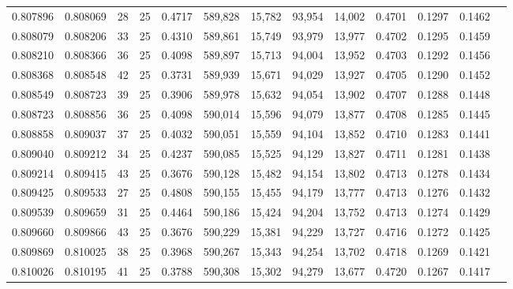 \begin{tabular}{rrrrrrrrrrrrr}
0.807896 & 0.808069 &    28 &  25 &                                     0.4717 & 589,828 &  15,782 &  93,954 &  14,002 & 0.4701 & 0.1297 & 0.1462 \\
0.808079 & 0.808206 &    33 &  25 &                                     0.4310 & 589,861 &  15,749 &  93,979 &  13,977 & 0.4702 & 0.1295 & 0.1459 \\
0.808210 & 0.808366 &    36 &  25 &                                     0.4098 & 589,897 &  15,713 &  94,004 &  13,952 & 0.4703 & 0.1292 & 0.1456 \\
0.808368 & 0.808548 &    42 &  25 &                                     0.3731 & 589,939 &  15,671 &  94,029 &  13,927 & 0.4705 & 0.1290 & 0.1452 \\
0.808549 & 0.808723 &    39 &  25 &                                     0.3906 & 589,978 &  15,632 &  94,054 &  13,902 & 0.4707 & 0.1288 & 0.1448 \\
0.808723 & 0.808856 &    36 &  25 &                                     0.4098 & 590,014 &  15,596 &  94,079 &  13,877 & 0.4708 & 0.1285 & 0.1445 \\
0.808858 & 0.809037 &    37 &  25 &                                     0.4032 & 590,051 &  15,559 &  94,104 &  13,852 & 0.4710 & 0.1283 & 0.1441 \\
0.809040 & 0.809212 &    34 &  25 &                                     0.4237 & 590,085 &  15,525 &  94,129 &  13,827 & 0.4711 & 0.1281 & 0.1438 \\
0.809214 & 0.809415 &    43 &  25 &                                     0.3676 & 590,128 &  15,482 &  94,154 &  13,802 & 0.4713 & 0.1278 & 0.1434 \\
0.809425 & 0.809533 &    27 &  25 &                                     0.4808 & 590,155 &  15,455 &  94,179 &  13,777 & 0.4713 & 0.1276 & 0.1432 \\
0.809539 & 0.809659 &    31 &  25 &                                     0.4464 & 590,186 &  15,424 &  94,204 &  13,752 & 0.4713 & 0.1274 & 0.1429 \\
0.809660 & 0.809866 &    43 &  25 &                                     0.3676 & 590,229 &  15,381 &  94,229 &  13,727 & 0.4716 & 0.1272 & 0.1425 \\
0.809869 & 0.810025 &    38 &  25 &                                     0.3968 & 590,267 &  15,343 &  94,254 &  13,702 & 0.4718 & 0.1269 & 0.1421 \\
0.810026 & 0.810195 &    41 &  25 &                                     0.3788 & 590,308 &  15,302 &  94,279 &  13,677 & 0.4720 & 0.1267 & 0.1417 \\

\end{tabular}

